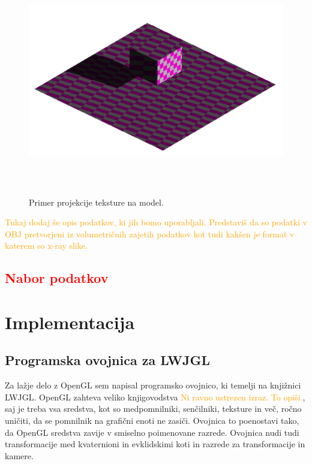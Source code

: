 \documentclass[a4paper, 12pt]{book}
\begin{document}
\begin{figure}[h]
\begin{center}
\includegraphics[width=12cm, height=10cm, keepaspectratio=true]{Tekstura_projecirana_na_model.png}
\end{center}
\caption{Primer projekcije teksture na model.}
\label{teksturaprojecirananamodel}
\end{figure}

\textcolor{orange}{Tukaj dodaj še opis podatkov, ki jih bomo uporabljali. Predstaviš da so podatki v OBJ pretvorjeni iz volumetričnih zajetih podatkov kot tudi kakšen je format v katerem so x-ray slike.}

\textcolor{red}{\section{Nabor podatkov}}
\textcolor{red}{}

\chapter{Implementacija}
\section{Programska ovojnica za LWJGL}

Za lažje delo z OpenGL sem napisal programsko ovojnico, ki temelji na knjižnici LWJGL. OpenGL zahteva veliko knjigovodstva \textcolor{orange}{Ni ravno ustrezen izraz. To opiši.}, saj je treba vsa sredstva, kot so medpomnilniki, senčilniki, teksture in več, ročno uničiti, da se pomnilnik na grafični enoti ne zasiči. Ovojnica to poenostavi tako, da OpenGL sredstva zavije v smiselno poimenovane razrede. Ovojnica nudi tudi transformacije med kvaternioni in evklidskimi koti in razrede za transformacije in kamere.
\end{document}
